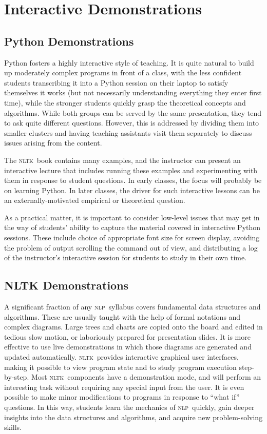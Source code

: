 \documentclass[11pt]{article}
\newcommand{\NLP}{\textsc{nlp}}
\newcommand{\NLTK}{\textsc{nltk}}
\begin{document}
\section{Interactive Demonstrations}
\label{sec:interactive-demonstrations}

\subsection{Python Demonstrations}

Python fosters a highly interactive style of teaching.  It is quite
natural to build up moderately complex programs in front of a class,
with the less confident students transcribing it into a Python session on
their laptop to satisfy themselves it works (but not necessarily
understanding everything they enter first time), while the stronger
students quickly grasp the theoretical concepts and algorithms.  While
both groups can be served by the same presentation, they tend to ask
quite different questions.  However, this is addressed by dividing
them into smaller clusters and having teaching assistants visit them
separately to discuss issues arising from the content.

The \NLTK\ book contains many examples, and the instructor
can present an interactive lecture that includes running these examples
and experimenting with them in response to student questions.  In early
classes, the focus will probably be on learning Python.  In later classes,
the driver for such interactive lessons can be an externally-motivated
empirical or theoretical question.

As a practical matter, it is important to consider low-level issues
that may get in the way of students' ability to capture the material
covered in interactive Python sessions.  These include choice of
appropriate font size for screen display, avoiding the problem of output scrolling the
command out of view, and distributing a log of the instructor's interactive session
for students to study in their own time.


\subsection{NLTK Demonstrations}

A significant fraction of any \NLP\ syllabus covers fundamental data
structures and algorithms. These are usually taught with the help of
formal notations and complex diagrams. Large trees and charts are
copied onto the board and edited in tedious slow motion, or
laboriously prepared for presentation slides. It is more effective to
use live demonstrations in which those diagrams are generated and
updated automatically. \NLTK\ provides interactive graphical user
interfaces, making it possible to view program state and to study
program execution step-by-step. Most \NLTK\ components have a
demonstration mode, and will perform an interesting task without
requiring any special input from the user. It is even possible to make
minor modifications to programs in response to ``what if'' questions. In
this way, students learn the mechanics of \NLP\ quickly, gain deeper
insights into the data structures and algorithms, and acquire new
problem-solving skills.
\end{document}
